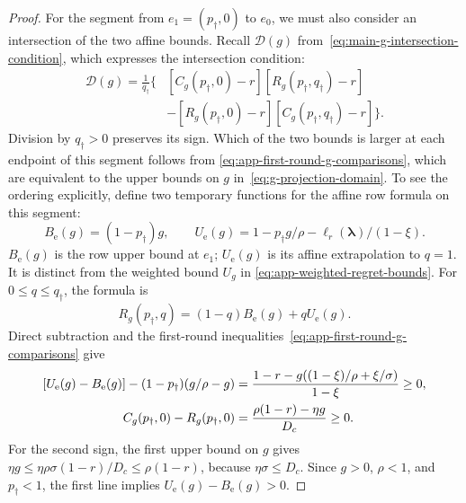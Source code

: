 \documentclass[11pt]{article}
\theoremstyle{remark}
\theoremstyle{plain}
\begin{document}
\begin{proof}
For the segment from $e_1=(p_\dagger,0)$ to $e_0$, we must also
consider an intersection of the two affine bounds. Recall
$\mathcal D(g)$ from~\eqref{eq:main-g-intersection-condition}, which
expresses the intersection condition:
\begin{equation}
 \begin{aligned}
 \mathcal D(g)=\frac1{q_\dagger}\bigl\{&
 [C_g(p_\dagger,0)-r][R_g(p_\dagger,q_\dagger)-r]\\
 &-[R_g(p_\dagger,0)-r][C_g(p_\dagger,q_\dagger)-r]\bigr\}.
 \end{aligned}
 \label{eq:app-zero-endpoint-determinant}
\end{equation}
Division by $q_\dagger>0$ preserves its sign.
Which of the two bounds is larger at each endpoint of this segment
follows from
\eqref{eq:app-first-round-g-comparisons}, which are equivalent to
the upper bounds on $g$ in~\eqref{eq:g-projection-domain}.
To see the ordering explicitly, define two temporary functions
for the affine row formula on this segment:
\begin{equation}
 B_{\mathrm e}(g)=(1-p_\dagger)g,\qquad
 U_{\mathrm e}(g)=1-p_\dagger g/\rho-\ell_r(\boldsymbol\lambda)/(1-\xi).
 \label{eq:app-lower-segment-affine-values}
\end{equation}
$B_{\mathrm e}(g)$ is the row upper bound at $e_1$;
$U_{\mathrm e}(g)$ is its affine extrapolation to $q=1$.
It is distinct from the weighted bound $U_g$ in
\eqref{eq:app-weighted-regret-bounds}.
For $0\le q\le q_\dagger$, the formula is
\begin{equation}
 R_g(p_\dagger,q)
       =(1-q)B_{\mathrm e}(g)+qU_{\mathrm e}(g).
 \label{eq:app-lower-segment-row-formula}
\end{equation}
Direct subtraction and the first-round
inequalities~\eqref{eq:app-first-round-g-comparisons} give
\begin{equation}
 \begin{aligned}
 \relax[U_{\mathrm e}(g)-B_{\mathrm e}(g)]
        -(1-p_\dagger)(g/\rho-g)
 &=\frac{1-r-g((1-\xi)/\rho+\xi/\sigma)}{1-\xi}\ge0,\\
 C_g(p_\dagger,0)-R_g(p_\dagger,0)
 &=\frac{\rho(1-r)-\eta g}{D_c}\ge0.
 \end{aligned}
 \label{eq:app-lower-segment-endpoint-order}
\end{equation}
For the second sign, the first upper bound on $g$ gives
$\eta g\le\eta\rho\sigma(1-r)/D_c\le\rho(1-r)$,
because $\eta\sigma\le D_c$.
Since $g>0$, $\rho<1$, and $p_\dagger<1$,
the first line implies $U_{\mathrm e}(g)-B_{\mathrm e}(g)>0$.

\end{proof}
\end{document}
